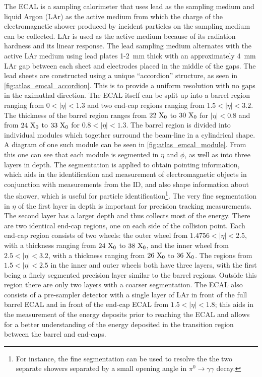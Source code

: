 The ECAL is a sampling calorimeter that uses lead as the sampling
medium and liquid Argon (LAr) as
the active medium from which the charge of the electromagnetic
shower produced by incident particles on the sampling medium
can be collected.  LAr is used as the active medium 
because of its radiation hardness and its linear response.
The lead sampling medium alternates with the active LAr medium
using lead plates 1-2~mm thick with an approximately 4~mm 
LAr gap between each sheet and electrodes placed in the middle of
the gaps.
The lead sheets are constructed using a unique ``accordion'' structure,
as seen in \fig\ref{fig:atlas_emcal_accordion}. 
This is to provide a uniform resolution with no gaps
in the azimuthal direction.
The ECAL itself can be split up into a barrel region ranging
from $0<|\eta|<1.3$ and two end-cap regions ranging from 
$1.5 < |\eta| < 3.2$.
The thickness of the barrel region 
ranges from $22~\textrm{X}_0$ to $30~\textrm{X}_0$
for $|\eta|<0.8$ and from $24~\textrm{X}_0$ to $33~\textrm{X}_0$ for
$0.8 < |\eta| < 1.3$.
The barrel region is divided into individual modules
which together surround the beam-line
in a cylindrical shape.  A diagram of one such module
can be seen in \fig\ref{fig:atlas_emcal_module}.
From this one can see that each module is segmented in $\eta$
and $\phi$, as well as into three layers in depth.
The segmentation is applied to obtain pointing information, 
which aids in the identification and measurement of electromagnetic
objects in conjunction with measurements from the ID,
and also shape information about the shower, which is useful
for particle identification\footnote{For instance,
the fine segmentation can be used to resolve the the two
separate showers separated by a small opening angle in 
$\pi^0\to\gamma\gamma$ decay.}.
The very fine segmentation in $\eta$ of the first layer
in depth is important for precision tracking measurements.
The second layer has a larger depth and thus collects most of the energy.
There are two identical end-cap regions, one on each side of the 
collision point. Each end-cap region consists of two wheels: the 
outer wheel from $1.4756 < |\eta| < 2.5$, with a thickness ranging from
$24~\textrm{X}_0$ to $38~\textrm{X}_0$, and 
the inner wheel from $2.5 < |\eta| < 3.2$, with a thickness ranging from
$26~\textrm{X}_0$ to $36~\textrm{X}_0$.
The regions from $1.5 < |\eta|<2.5$ in the inner and outer wheels both
have three layers, with the first being a finely segmented precision
layer similar to the barrel regions. Outside this region there 
are only two layers with a coarser segmentation.
The ECAL also consists of a pre-sampler detector with a single layer of LAr in 
front of the full barrel ECAL and in front of the end-cap ECAL 
from $1.5 < |\eta| < 1.8$; this aids in the measurement of the energy deposits
prior to reaching the ECAL and allows 
for a better understanding of the energy deposited
in the transition region between the barrel and end-caps.


